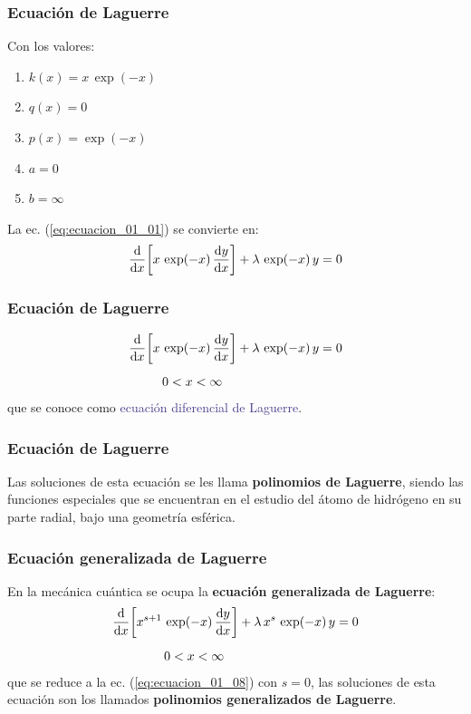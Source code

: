\documentclass[12pt]{beamer}
\begin{document}
\begin{frame}
\frametitle{Ecuación de Laguerre}
Con los valores:
\pause
{}
\begin{multicols}{2}
\begin{enumerate}[<+->]
\item $k(x) = x \, \exp(-x)$
\item $q(x) = 0$
\item $p(x) = \exp(-x)$
\item $a = 0$
\item $b = \infty$
\end{enumerate}
\end{multicols}
\pause
La ec. (\ref{eq:ecuacion_01_01}) se convierte en:
\begin{align}
\dv{x} \bigg[ x \, \exp(-x) \, \dv{y}{x} \bigg] + \lambda \, \exp(-x) \, y = 0
\label{eq:ecuacion_01_08}
\end{align}
\end{frame}
\begin{frame}
\frametitle{Ecuación de Laguerre}
\begin{align*}
\dv{x} \bigg[ x \, &\exp(-x) \, \dv{y}{x} \bigg] + \lambda \, \exp(-x) \, y = 0 \\[0.5em]
&0 < x < \infty
\end{align*}
\pause
que se conoce como \textcolor{darkslateblue}{ecuación diferencial de Laguerre}.
\end{frame}
\begin{frame}
\frametitle{Ecuación de Laguerre}
Las soluciones de esta ecuación se les llama \textbf{\textcolor{denim}{polinomios de Laguerre}}, siendo las funciones especiales que se encuentran en el estudio del átomo de hidrógeno en su parte radial, bajo una geometría esférica.
\end{frame}
\begin{frame}
\frametitle{Ecuación generalizada de Laguerre}
En la mecánica cuántica se ocupa la \textbf{\textcolor{electricpurple}{ecuación generalizada de Laguerre}}:
\pause
\begin{align*}
\dv{x} \bigg[ x^{s+1} \, &\exp(-x) \, \dv{y}{x} \bigg] + \lambda \, x^{s} \, \exp(-x) \, y = 0 \\[0.5em]
&0 < x < \infty
\end{align*}
\pause
que se reduce a la ec. (\ref{eq:ecuacion_01_08}) con $s = 0$, las soluciones de esta ecuación son los llamados \textbf{\textcolor{fandango}{polinomios generalizados de Laguerre}}.
\end{frame}  
\end{document}
